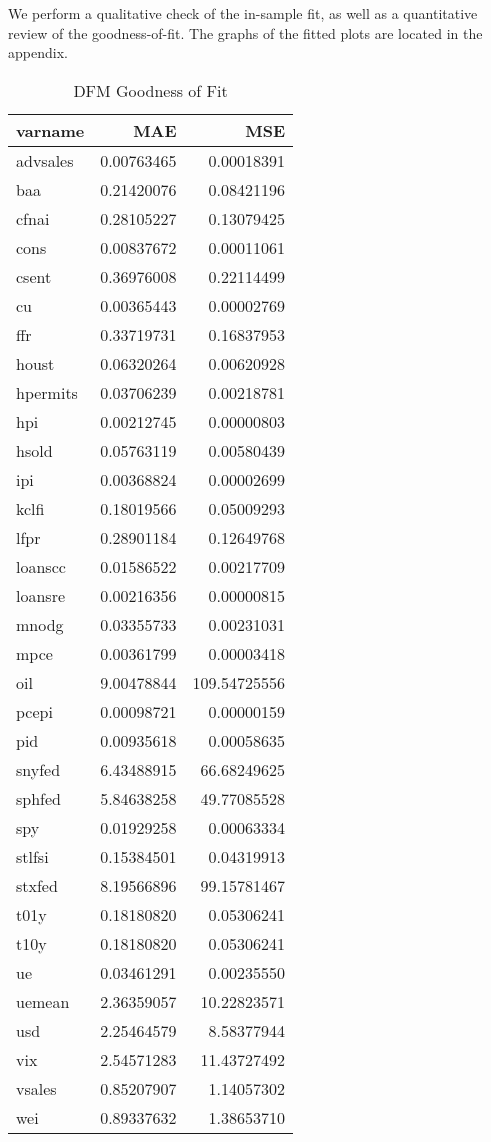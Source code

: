 \documentclass[11pt, letterpaper]{article}\usepackage[]{graphicx}\usepackage[]{color}
\begin{document}
We perform a qualitative check of the in-sample fit, as well as a quantitative review of the goodness-of-fit. The graphs of the fitted plots are located in the appendix.
\begin{table}[H]
\centering
\begingroup\footnotesize
\begin{tabular}{lrr}
  \hline
varname & MAE & MSE \\ 
  \hline
advsales & 0.00763465 & 0.00018391 \\ 
  baa & 0.21420076 & 0.08421196 \\ 
  cfnai & 0.28105227 & 0.13079425 \\ 
  cons & 0.00837672 & 0.00011061 \\ 
  csent & 0.36976008 & 0.22114499 \\ 
  cu & 0.00365443 & 0.00002769 \\ 
  ffr & 0.33719731 & 0.16837953 \\ 
  houst & 0.06320264 & 0.00620928 \\ 
  hpermits & 0.03706239 & 0.00218781 \\ 
  hpi & 0.00212745 & 0.00000803 \\ 
  hsold & 0.05763119 & 0.00580439 \\ 
  ipi & 0.00368824 & 0.00002699 \\ 
  kclfi & 0.18019566 & 0.05009293 \\ 
  lfpr & 0.28901184 & 0.12649768 \\ 
  loanscc & 0.01586522 & 0.00217709 \\ 
  loansre & 0.00216356 & 0.00000815 \\ 
  mnodg & 0.03355733 & 0.00231031 \\ 
  mpce & 0.00361799 & 0.00003418 \\ 
  oil & 9.00478844 & 109.54725556 \\ 
  pcepi & 0.00098721 & 0.00000159 \\ 
  pid & 0.00935618 & 0.00058635 \\ 
  snyfed & 6.43488915 & 66.68249625 \\ 
  sphfed & 5.84638258 & 49.77085528 \\ 
  spy & 0.01929258 & 0.00063334 \\ 
  stlfsi & 0.15384501 & 0.04319913 \\ 
  stxfed & 8.19566896 & 99.15781467 \\ 
  t01y & 0.18180820 & 0.05306241 \\ 
  t10y & 0.18180820 & 0.05306241 \\ 
  ue & 0.03461291 & 0.00235550 \\ 
  uemean & 2.36359057 & 10.22823571 \\ 
  usd & 2.25464579 & 8.58377944 \\ 
  vix & 2.54571283 & 11.43727492 \\ 
  vsales & 0.85207907 & 1.14057302 \\ 
  wei & 0.89337632 & 1.38653710 \\ 
   \hline
\end{tabular}
\endgroup
\caption{DFM Goodness of Fit} 
\end{table}
\end{document}
